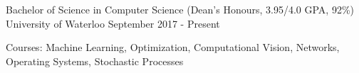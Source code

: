 
\begin{cventries}
  \cventry
    {Bachelor of Science in Computer Science (Dean's Honours, 3.95/4.0 GPA, 92\%)} %
    {University of Waterloo} %
    {} %
    {September 2017 - Present} %
    {
      \begin{cvitems} %
        \item {Courses: Machine Learning, Optimization, Computational Vision, Networks, Operating Systems, Stochastic Processes}
      \end{cvitems}
    }
\end{cventries}
